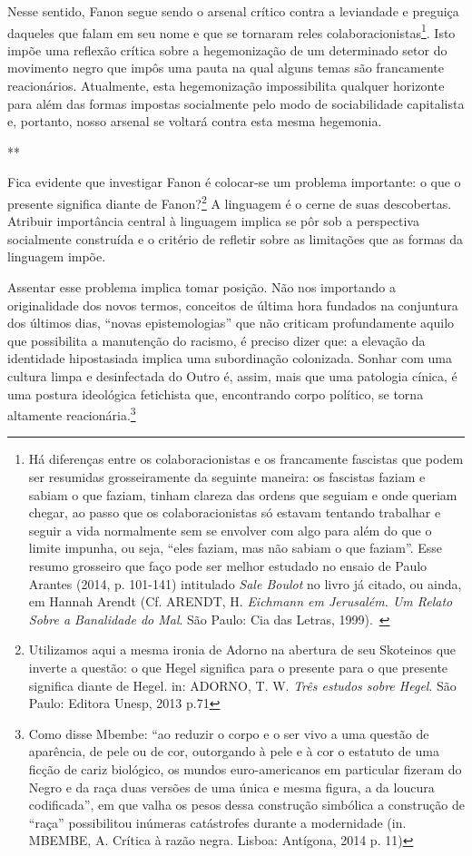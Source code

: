 Nesse sentido, Fanon segue sendo o arsenal crítico contra a leviandade e
preguiça daqueles que falam em seu nome e que se tornaram reles
colaboracionistas\footnote{Há diferenças entre os colaboracionistas e os
  francamente fascistas que podem ser resumidas grosseiramente da
  seguinte maneira: os fascistas faziam e sabiam o que faziam, tinham
  clareza das ordens que seguiam e onde queriam chegar, ao passo que os
  colaboracionistas só estavam tentando trabalhar e seguir a vida
  normalmente sem se envolver com algo para além do que o limite
  impunha, ou seja, ``eles faziam, mas não sabiam o que faziam''. Esse
  resumo grosseiro que faço pode ser melhor estudado no ensaio de Paulo
  Arantes (2014, p. 101-141) intitulado \emph{Sale Boulot} no livro já
  citado, ou ainda, em Hannah Arendt (Cf. ARENDT, H. \emph{Eichmann em
  Jerusalém. Um Relato Sobre a Banalidade do Mal}. São Paulo: Cia das
  Letras, 1999).~}. Isto impõe uma reflexão crítica sobre a
hegemonização de um determinado setor do movimento negro que impôs uma
pauta na qual alguns temas são francamente reacionários. Atualmente,
esta hegemonização impossibilita qualquer horizonte para além das formas
impostas socialmente pelo modo de sociabilidade capitalista e, portanto,
nosso arsenal se voltará contra esta mesma hegemonia.

**

Fica evidente que investigar Fanon é colocar-se um problema importante:
o que o presente significa diante de Fanon?\footnote{Utilizamos aqui a
  mesma ironia de Adorno na abertura de seu Skoteinos que inverte a
  questão: o que Hegel significa para o presente para o que presente
  significa diante de Hegel. in: ADORNO, T. W. \emph{Três estudos sobre
  Hegel}. São Paulo: Editora Unesp, 2013 p.71} A linguagem é o cerne de
suas descobertas. Atribuir importância central à linguagem implica se
pôr sob a perspectiva socialmente construída e o critério de refletir
sobre as limitações que as formas da linguagem impõe.

Assentar esse problema implica tomar posição. Não nos importando a
originalidade dos novos termos, conceitos de última hora fundados na
conjuntura dos últimos dias, ``novas epistemologias'' que não criticam
profundamente aquilo que possibilita a manutenção do racismo, é preciso
dizer que: a elevação da identidade hipostasiada implica uma
subordinação colonizada. Sonhar com uma cultura limpa e desinfectada do
Outro é, assim, mais que uma patologia cínica, é uma postura ideológica
fetichista que, encontrando corpo político, se torna altamente
reacionária.\footnote{Como disse Mbembe: ``ao reduzir o corpo e o ser
  vivo a uma questão de aparência, de pele ou de cor, outorgando à pele
  e à cor o estatuto de uma ficção de cariz biológico, os mundos
  euro-americanos em particular fizeram do Negro e da raça duas versões
  de uma única e mesma figura, a da loucura codificada'', em que valha
  os pesos dessa construção simbólica a construção de ``raça''
  possibilitou inúmeras catástrofes durante a modernidade (in. MBEMBE,
  A. Crítica à razão negra. Lisboa: Antígona, 2014 p. 11)}

